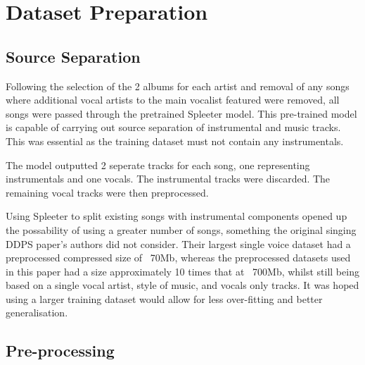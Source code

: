 \section{Dataset Preparation}

\subsection{Source Separation}

Following the selection of the 2 albums for each artist and removal of any songs where additional vocal artists to the main vocalist featured were removed, all songs were passed through the pretrained Spleeter model\cite{SpleeterPip}\cite{SpleeterPip}. This pre-trained model is capable of carrying out source separation of instrumental and music tracks. This was essential as the training dataset must not contain any instrumentals.

The model outputted 2 seperate tracks for each song, one representing instrumentals and one vocals. The instrumental tracks were discarded. The remaining vocal tracks were then preprocessed.

Using Spleeter to split existing songs with instrumental components opened up the possability of using a greater number of songs, something the original singing DDPS paper's authors did not consider. Their largest single voice dataset had a preprocessed compressed size of ~70Mb, whereas the preprocessed datasets used in this paper had a size approximately 10 times that at ~700Mb, whilst still being based on a single vocal artist, style of music, and vocals only tracks. It was hoped using a larger training dataset would allow for less over-fitting and better generalisation.

\subsection{Pre-processing}

